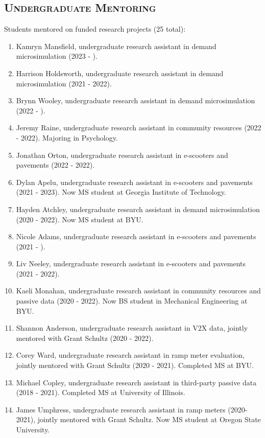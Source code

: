 \documentclass[margin,line]{res}
\newcounter{enuminitialize}
\newenvironment{myenum}[1][]
{%
 \setcounter{enuminitialize}{#1}
 \addtocounter{enuminitialize}{2}
 \begin{enumerate}[left= 4pt, itemsep=12pt, start=\value{enuminitialize}, label=\arabic*\addtocounter{enumi}{-2}]
}
{%
 \end{enumerate}
}
\newcommand{\secfont}{\scshape }
\begin{document}
\begin{resume}
\noindent\makebox[\linewidth]{\rule{\linewidth}{0.4pt}}
\section{\secfont Undergraduate Mentoring}

Students mentored on funded research projects (25 total):
\vspace{0.2cm}
\begin{myenum}[25]
  \item Kamryn Mansfield, undergraduate research assistant in demand microsimulation (2023 - ).
  \item Harrison Holdsworth, undergraduate research assistant in demand microsimulation (2021 - 2022).
  \item Brynn Wooley, undergraduate research assistant in demand microsimulation (2022 - ).
  \item Jeremy Raine, undergraduate research assistant in community resources (2022 - 2022). Majoring in Psychology.
  \item Jonathan Orton, undergraduate research assistant in e-scooters and pavements (2022 - 2022).
  \item Dylan Apelu, undergraduate research assistant in e-scooters and pavements (2021 - 2023). Now MS student at Georgia Institute of Technology.
  \item Hayden Atchley, undergraduate research assistant in demand microsimulation (2020 - 2022). Now MS student at BYU.
  \item Nicole Adams, undergraduate research assistant in e-scooters and pavements (2021 - ).
  \item Liv Neeley, undergraduate research assistant in e-scooters and pavements (2021 - 2022).
  \item Kaeli Monahan, undergraduate research assistant in community resources and passive data (2020 - 2022). Now BS student in Mechanical Engineering at BYU.
  \item Shannon Anderson, undergraduate research assistant in V2X data, jointly mentored with Grant Schultz (2020 - 2022).
  \item Corey Ward, undergraduate research assistant in ramp meter evaluation, jointly mentored with Grant Schultz (2020 - 2021). Completed MS at BYU.
  \item Michael Copley, undergraduate research assistant in third-party passive data (2018 - 2021). Completed MS at University of Illinois.
  \item James Umphress, undergraduate research assistant in ramp meters (2020-2021), jointly mentored with Grant Schultz. Now MS student at Oregon State University.

\end{myenum}
\end{resume}
\end{document}
